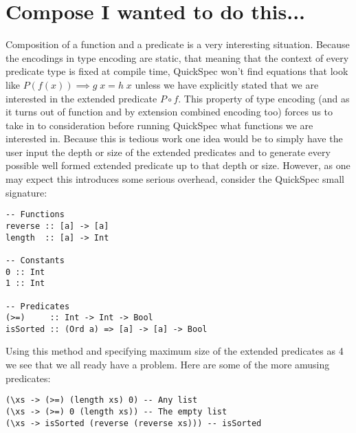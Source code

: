\section{Compose I wanted to do this...}
Composition of a function and a predicate
is a very interesting situation. Because the
encodings in type encoding are static, that meaning
that the context of every predicate type is fixed
at compile time, QuickSpec won't find equations
that look like $P(f(x))\implies g\;x=h\;x$
unless we have explicitly stated that we are interested
in the extended predicate $P \circ f$. This property of type encoding
(and as it turns out of function and by extension combined encoding too)
forces us to take in to consideration before running QuickSpec
what functions we are interested in. %
Because this is tedious work one idea would be to simply have the user input the depth or size
of the extended predicates and to generate every possible well formed
extended predicate up to that depth or size. However, as one may expect
this introduces some serious overhead, consider the QuickSpec small signature:
\begin{verbatim}
-- Functions
reverse :: [a] -> [a]
length  :: [a] -> Int

-- Constants
0 :: Int
1 :: Int

-- Predicates
(>=)     :: Int -> Int -> Bool 
isSorted :: (Ord a) => [a] -> [a] -> Bool
\end{verbatim}
Using this method and specifying maximum size of the extended predicates as 4
we see that we all ready have a problem. Here are some of the more amusing predicates:
\begin{verbatim}
(\xs -> (>=) (length xs) 0) -- Any list
(\xs -> (>=) 0 (length xs)) -- The empty list
(\xs -> isSorted (reverse (reverse xs))) -- isSorted
\end{verbatim}
